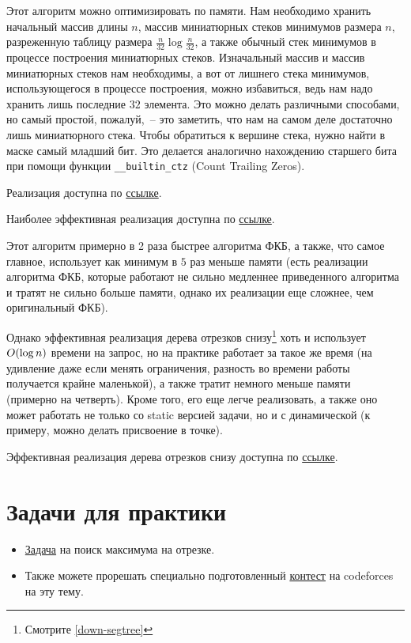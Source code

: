 \begin{observation}
    Этот алгоритм можно оптимизировать по памяти. Нам необходимо хранить начальный массив длины $n$, массив миниатюрных стеков минимумов размера $n$, разреженную таблицу размера $\frac{n}{32} \log{\frac{n}{32}}$, а также обычный стек минимумов в процессе построения миниатюрных стеков. Изначальный массив и массив миниатюрных стеков нам необходимы, а вот от лишнего стека минимумов, использующегося в процессе построения, можно избавиться, ведь нам надо хранить лишь последние $32$ элемента. Это можно делать различными способами, но самый простой, пожалуй,~-- это заметить, что нам на самом деле достаточно лишь миниатюрного стека. Чтобы обратиться к вершине стека, нужно найти в маске самый младший бит. Это делается аналогично нахождению старшего бита при помощи функции \verb+__builtin_ctz+ (Count Trailing Zeros).
\end{observation}

Реализация доступна по \href{https://pastebin.com/4wS8Zjj1}{ссылке}.

Наиболее эффективная реализация доступна по \href{https://pastebin.com/gXs9yNKr}{ссылке}.

Этот алгоритм примерно в 2 раза быстрее алгоритма ФКБ, а также, что самое главное, использует как минимум в $5$ раз меньше памяти (есть реализации алгоритма ФКБ, которые работают не сильно медленнее приведенного алгоритма и тратят не сильно больше памяти, однако их реализации еще сложнее, чем оригинальный ФКБ).

Однако эффективная реализация дерева отрезков снизу\footnote{Смотрите \ref{down-segtree}} хоть и использует $O(\log n)$ времени на запрос, но на практике работает за такое же время (на удивление даже если менять ограничения, разность во времени работы получается крайне маленькой), а также тратит немного меньше памяти (примерно на четверть). Кроме того, его еще легче реализовать, а также оно может работать не только со static версией задачи, но и с динамической (к примеру, можно делать присвоение в точке).

Эффективная реализация дерева отрезков снизу доступна по \href{https://pastebin.com/n1NzdcLQ}{ссылке}.


\section{Задачи для практики}

\begin{itemize}
    \item \href{https://informatics.msk.ru/mod/statements/view.php?id=597&chapterid=752\#1}{Задача} на поиск максимума на отрезке.

    \item Также можете прорешать специально подготовленный \href{https://codeforces.com/group/1rv4rhCsHp/contest/325878}{контест} на codeforces на эту тему.   
\end{itemize}


